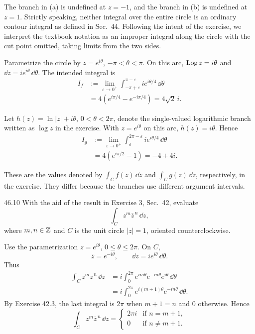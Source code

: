 \documentclass[11pt,oneside]{article}
\begin{document}
\begin{solution}
The branch in (a) is undefined at \(z=-1\), and the branch in (b) is undefined at \(z=1\). Strictly speaking, neither integral over the entire circle is an ordinary contour integral as defined in Sec.~44. Following the intent of the exercise, we interpret the textbook notation as an improper integral along the circle with the cut point omitted, taking limits from the two sides.
\begin{exercisesubparts}
    \item Parametrize the circle by \(z=e^{i\theta}\), \(-\pi<\theta<\pi\). On this arc, \(\operatorname{Log} z=i\theta\) and \(\dd z=ie^{i\theta}\,\dd\theta\). The intended integral is
    \[
    \begin{aligned}
        I_f
        &:=\lim_{\varepsilon\to0^+}
          \int_{-\pi+\varepsilon}^{\pi-\varepsilon}
          ie^{i\theta/4}\,\dd\theta\\
        &=4(e^{i\pi/4}-e^{-i\pi/4})
         =\boxed{4\sqrt2\,i}.
    \end{aligned}
    \]
    \item Let \(h(z)=\ln|z|+i\theta\), \(0<\theta<2\pi\), denote the single-valued logarithmic branch written as \(\log z\) in the exercise. With \(z=e^{i\theta}\) on this arc, \(h(z)=i\theta\). Hence
    \[
    \begin{aligned}
        I_g
        &:=\lim_{\varepsilon\to0^+}
          \int_{\varepsilon}^{2\pi-\varepsilon}
          ie^{i\theta/4}\,\dd\theta\\
        &=4(e^{i\pi/2}-1)
         =\boxed{-4+4i}.
    \end{aligned}
    \]
\end{exercisesubparts}
These are the values denoted by \(\int_C f(z)\,\dd z\) and \(\int_C g(z)\,\dd z\), respectively, in the exercise. They differ because the branches use different argument intervals.
\end{solution}

\begin{exercise}{46.10}
With the aid of the result in Exercise 3, Sec.~42, evaluate
\[
    \int_C z^m\overline z^{\,n}\,\dd z,
\]
where \(m, n\in\mathbb{Z}\) and \(C\) is the unit circle \(|z|=1\), oriented counterclockwise.
\end{exercise}

\begin{solution}
Use the parametrization \(z=e^{i\theta}\), \(0\le\theta\le2\pi\). On \(C\),
\[
    \overline z=e^{-i\theta}, \qquad
    \dd z=ie^{i\theta}\,\dd\theta.
\]
Thus
\[
\begin{aligned}
    \int_Cz^m\overline z^{\,n}\,\dd z
    &=i\int_0^{2\pi}e^{im\theta}e^{-in\theta}e^{i\theta}\,\dd\theta\\
    &=i\int_0^{2\pi}e^{i(m+1)\theta}e^{-in\theta}\,\dd\theta.
\end{aligned}
\]
By Exercise 42.3, the last integral is \(2\pi\) when \(m+1=n\) and \(0\) otherwise. Hence
\[
    \boxed{\int_Cz^m\overline z^{\,n}\,\dd z
    =\begin{cases}
        2\pi i&\text{if }n=m+1, \\
        0&\text{if }n\ne m+1.
      \end{cases}}
\]
\end{solution}
\end{document}

